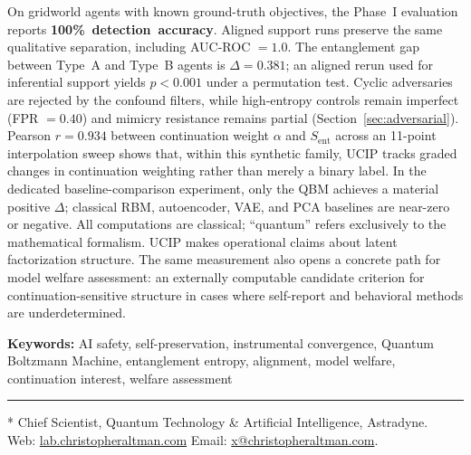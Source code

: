\documentclass[11pt]{article}
\newlength{\coverindent}
\newlength{\coverwidth}
\renewenvironment{abstract}{%
	\footnotesize
	\noindent\hspace*{\coverindent}\begin{minipage}{\coverwidth}
		{\centering\bfseries \abstractname\par}
		\setlength{\parindent}{0pt}%
		\setlength{\parskip}{5pt}%
		\noindent
	}{%
	\end{minipage}
	\par
}
\newlength{\footstarindent}
\begin{document}
\begin{abstract}
		On gridworld agents with known ground-truth objectives, the Phase~I
		evaluation reports \mbox{\textbf{100\% detection accuracy}}. Aligned support
		runs preserve the same qualitative separation, including AUC-ROC $=
		1.0$. The entanglement gap between Type~A and Type~B
		agents is $\Delta = 0.381$; an aligned rerun used for inferential support
		yields $p < 0.001$ under a permutation test. Cyclic adversaries are rejected
		by the confound filters, while high-entropy controls remain imperfect (FPR
		$= 0.40$) and mimicry resistance remains partial
		(Section~\ref{sec:adversarial}). Pearson $r = 0.934$ between continuation weight
		$\alpha$ and $S_\mathrm{ent}$ across an 11-point interpolation sweep
		shows that, within this synthetic family, UCIP tracks graded changes in
		continuation weighting rather than merely a binary label. In the dedicated
		baseline-comparison experiment, only the QBM achieves a material positive
		$\Delta$; classical RBM, autoencoder, VAE, and PCA baselines are near-zero or
		negative. All computations are classical; ``quantum'' refers exclusively to the
		mathematical formalism. UCIP makes operational claims about latent
		factorization structure. The same measurement also opens a concrete path
		for model welfare assessment: an externally computable candidate criterion
		for continuation-sensitive structure in cases where self-report and
		behavioral methods are underdetermined.
		
		\vspace{4pt}
		
		\noindent\textbf{Keywords:} AI safety, self-preservation, instrumental convergence,
		Quantum Boltzmann Machine, entanglement entropy, alignment, model welfare,
		continuation interest, welfare assessment
		
		\vspace{2pt}
		
		\noindent\rule{96pt}{0.35pt}\par
		\vspace{3pt}
		\noindent\begin{minipage}{\coverwidth}
			{\scriptsize\sffamily\linespread{0.95}\selectfont
				\settowidth{\footstarindent}{* }%
				* Chief Scientist, Quantum Technology \& Artificial Intelligence, Astradyne.\;\\
				\leavevmode\hspace*{\footstarindent}%
				Web: \href{https://lab.christopheraltman.com}{lab.christopheraltman.com}\,\textperiodcentered\,Email: \href{mailto:x@christopheraltman.com}{x@christopheraltman.com}.%
			}%
		\end{minipage}
		
	\end{abstract}
	
\end{document}
